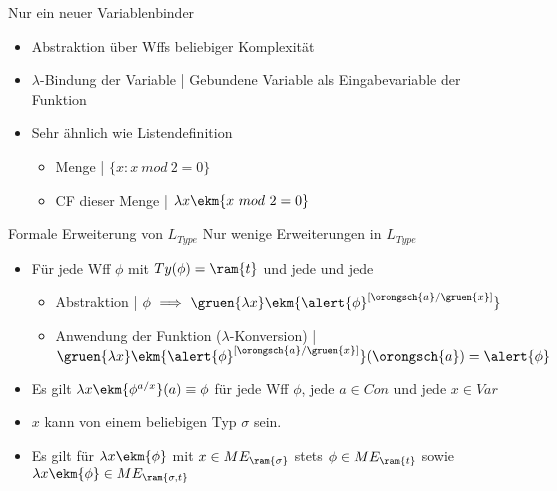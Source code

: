 \begin{frame}
  {Nur ein neuer Variablenbinder}
  \onslide<+->
  \onslide<+->
  \\
  \Halbzeile
  \begin{itemize}[<+->]
    \item Abstraktion über Wffs beliebiger Komplexität
    \item $\lambda$-Bindung der Variable | Gebundene Variable als \alert{Eingabevariable der Funktion}
    \item Sehr ähnlich wie Listendefinition
      \begin{itemize}[<+->]
        \item Menge | \alert{$\{x: x\ mod\ 2=0\}$} 
        \item CF dieser Menge | \alert{$\lambda x\ekm{x\ mod\ 2=0}$} 
      \end{itemize}
  \end{itemize}
\end{frame}

\begin{frame}
  {Formale Erweiterung von $L_{Type}$}
  \onslide<+->
  \onslide<+->
  Nur wenige Erweiterungen in $L_{Type}$\\
  \Halbzeile
  \begin{itemize}[<+->]
    \item Für jede Wff $\phi$ mit \alert{$Ty(\phi)=\ram{t}$} und jede  und jede 
      \Viertelzeile
      \begin{itemize}[<+->]
        \item Abstraktion | $\phi\ \Longrightarrow\ \gruen{\lambda x}\ekm{\alert{\phi}^{[\orongsch{a}/\gruen{x}]}}$\\
        \item Anwendung der Funktion ($\lambda$-Konversion) | $\gruen{\lambda x}\ekm{\alert{\phi}^{[\orongsch{a}/\gruen{x}]}}(\orongsch{a})=\alert{\phi}$
      \end{itemize}
      \Halbzeile
    \item Es gilt \alert{$\lambda{}x\ekm{\phi^{a/x}}(a)\equiv{}\phi$} für jede Wff $\phi$, jede $a\in Con$ und jede $x\in{}Var$
    \item $x$ kann von einem \alert{beliebigen Typ $\sigma$} sein.
    \item Es gilt für \alert{$\lambda x\ekm{\phi}$} mit $x\in ME_{\ram{\sigma}}$ stets \alert{\alert{$\phi\in ME_{\ram{t}}$}} sowie \alert{$\lambda x\ekm{\phi}\in ME_{\ram{\sigma,t}}$}
  \end{itemize}
\end{frame}

